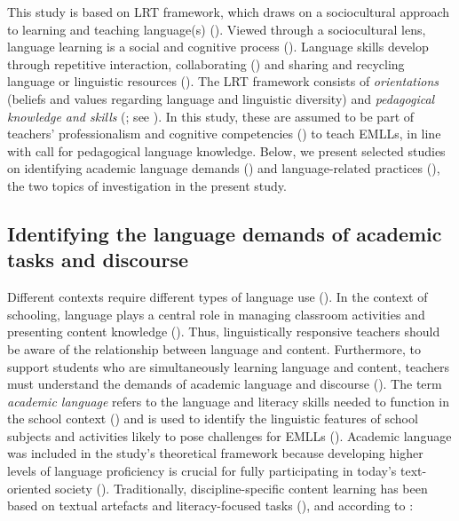 \documentclass[output=paper]{langscibook}
\begin{document}
This study is based on  LRT framework, which draws on a sociocultural approach to learning and teaching language(s) (\citealt{Donato2000,Gibbons2014,LantolfThorne2006,Lier2000,Vygotsky1978}). Viewed through a sociocultural lens, language learning is a social and cognitive process (\citealt{LantolfThorne2006,Vygotsky1978}). Language skills develop through repetitive interaction, collaborating (\citealt{Dufva2020,Vygotsky1978}) and sharing and recycling language or linguistic resources (\citealt{Dufva2013}). The LRT framework consists of \textit{orientations} (beliefs and values regarding language and linguistic diversity) and \textit{pedagogical knowledge and skills} (\citealt{chapters/7_alisaari}; see \citealt{chapters/6_iversen}). In this study, these are assumed to be part of teachers’ professionalism and cognitive competencies (\citealt{Kaiser2019-1}) to teach EMLLs, in line with  call for pedagogical language knowledge. Below, we present selected studies on identifying academic language demands () and language-related practices (), the two topics of investigation in the present study.

\subsection{Identifying the language demands of academic tasks and discourse}\label{sec:heikkola:3.1}

Different contexts require different types of language use (\citealt{Cummins2000, Cummins2021-1}). In the context of schooling, language plays a central role in managing classroom activities and presenting content knowledge (\citealt{Cummins2021,Schleppegrell2002}). Thus, linguistically responsive teachers should be aware of the relationship between language and content. Furthermore, to support students who are simultaneously learning language and content, teachers must understand the demands of academic language and discourse (\citealt{Cummins2000,Gibbons2014,Schleppegrell2002}). The term \textit{academic language} refers to the language and literacy skills needed to function in the school context (\citealt{Cummins2000, Cummins2021-1,Wong_fillmore2000-2}) and is used to identify the linguistic features of school subjects and activities likely to pose challenges for EMLLs (\citealt{LucasVillegas2013}). Academic language was included in the study’s theoretical framework because developing higher levels of language proficiency is crucial for fully participating in today’s text-oriented society (\citealt{Cummins2021,Haneda2014}). Traditionally, discipline-specific content learning has been based on textual artefacts and literacy-focused tasks (\citealt{Barton2007,LuukkaEtAl2008}), and according to \citet[162]{Cummins2021-1}:
\end{document}
